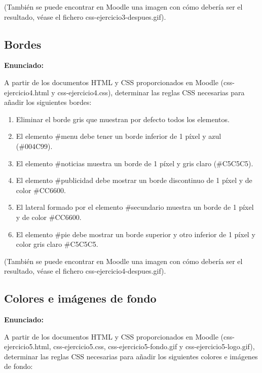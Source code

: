 (También se puede encontrar en Moodle una imagen con cómo debería ser el resultado, 
véase el fichero css-ejercicio3-despues.gif).


\subsection{Bordes}
\label{subsec:bordes}

\textbf{Enunciado:}

A partir de los documentos HTML y CSS proporcionados en Moodle (css-ejercicio4.html y css-ejercicio4.css), determinar las reglas CSS necesarias para añadir los siguientes bordes:

\begin{enumerate}
  \item Eliminar el borde gris que muestran por defecto todos los elementos.
  \item El elemento \#menu debe tener un borde inferior de 1 píxel y azul (\#004C99).
  \item El elemento \#noticias muestra un borde de 1 píxel y gris claro (\#C5C5C5).
  \item El elemento \#publicidad debe mostrar un borde discontinuo de 1 píxel y de color \#CC6600.
  \item El lateral formado por el elemento \#secundario muestra un borde de 1 píxel y de color \#CC6600.
  \item El elemento \#pie debe mostrar un borde superior y otro inferior de 1 píxel y color gris claro \#C5C5C5.
\end{enumerate}

(También se puede encontrar en Moodle una imagen con cómo debería ser el resultado, 
véase el fichero css-ejercicio4-despues.gif).

\subsection{Colores e imágenes de fondo}
\label{subsec:colores}

\textbf{Enunciado:}

A partir de los documentos HTML y CSS proporcionados en Moodle (css-ejercicio5.html, css-ejercicio5.css, css-ejercicio5-fondo.gif y css-ejercicio5-logo.gif), determinar las reglas CSS necesarias para añadir los siguientes colores e imágenes de fondo:

